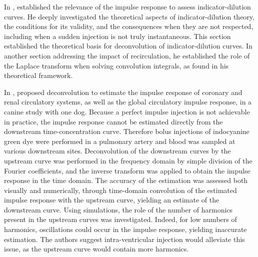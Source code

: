 In \citeyear{Zierler:1962cx}, \citet{Zierler:1962cx} established the relevance of the impulse response to assess indicator-dilution curves.
He deeply investigated the theoretical aspects of indicator-dilution theory, the conditions for its validity, and the consequences when they are not respected, including when a sudden injection is not truly instantaneous. 
This section established the theoretical basis for deconvolution of indicator-dilution curves. 
In another section addressing the impact of recirculation, he established the role of the Laplace transform when solving convolution integrals, as found in his theoretical framework.

In \citeyear{Coulam:1966un}, \citet{Coulam:1966un} proposed deconvolution to estimate the impulse response of coronary and renal circulatory systems, as well as the global circulatory impulse response, in a canine study with one dog.
Because a perfect impulse injection is not achievable in practice, the impulse response cannot be estimated directly from the downstream time-concentration curve.
Therefore bolus injections of indocyanine green dye were performed in a pulmonary artery and blood was sampled at various downstream sites.
Deconvolution of the downstream curves by the upstream curve was performed in the frequency domain by simple division of the Fourier coefficients, and the inverse transform was applied to obtain the impulse response in the time domain.
The accuracy of the estimation was assessed both visually and numerically, through time-domain convolution of the estimated impulse response with the upstream curve, yielding an estimate of the downstream curve. 
Using simulations, the role of the number of harmonics present in the upstream curves was investigated.
Indeed, for low numbers of harmonics, oscillations could occur in the impulse response, yielding inaccurate estimation.
The authors suggest intra-ventricular injection would alleviate this issue, as the upstream curve would contain more harmonics.

